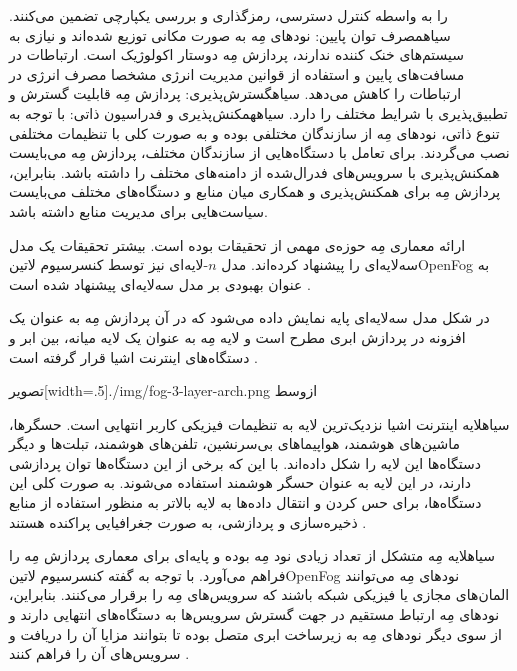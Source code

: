 را به واسطه کنترل دسترسی، رمزگذاری و بررسی یکپارچی تضمین می‌کنند.
 ‌سیاه{مصرف توان پایین}: نودهای مِه به صورت مکانی توزیع شده‌اند و نیازی به سیستم‌های خنک کننده ندارند، پردازش مِه دوستار اکولوژیک است.
ارتباطات در مسافت‌های پایین و استفاده از قوانین مدیریت انرژی مشخصا مصرف انرژی در ارتباطات را کاهش می‌دهد.
 ‌سیاه{گسترش‌پذیری}: پردازش مِه قابلیت گسترش و تطبیق‌پذیری با شرایط مختلف را دارد.
 ‌سیاه{همکنش‌پذیری و فدراسیون ذاتی}: با توجه به تنوع ذاتی، نودهای مِه از سازندگان مختلفی بوده و به صورت کلی با تنظیمات مختلفی نصب می‌گردند.
برای تعامل با دستگاه‌هایی از سازندگان مختلف، پردازش مِه می‌بایست همکنش‌پذیری با سرویس‌های فدرال‌شده از دامنه‌های مختلف را داشته باشد.
بنابراین، پردازش مِه برای همکنش‌پذیری و همکاری میان منابع و دستگاه‌های مختلف می‌بایست سیاست‌هایی برای مدیریت منابع داشته باشد.


ارائه معماری مِه حوزه‌ی مهمی از تحقیقات بوده است. بیشتر تحقیقات یک مدل سه‌لایه‌ای را پیشنهاد کرده‌اند.
مدل $n$-لایه‌ای نیز توسط کنسرسیوم ‌لاتین{OpenFog} به عنوان بهبودی بر مدل سه‌لایه‌ای پیشنهاد شده است
.

در شکل  مدل سه‌لایه‌ای پایه نمایش داده می‌شود که در آن پردازش مِه به عنوان
یک افزونه در پردازش ابری مطرح است و لایه مِه به عنوان یک لایه میانه، بین ابر و دستگاه‌های اینترنت اشیا قرار گرفته است
.

‌تصویر[width=.5\textwidth]{./img/fog-3-layer-arch.png}
‌ازوسط

‌سیاه{لایه اینترنت اشیا} نزدیک‌ترین لایه به تنظیمات فیزیکی کاربر انتهایی است. حسگرها، ماشین‌های هوشمند، هواپیماهای بی‌سرنشین،
تلفن‌های هوشمند، تبلت‌ها و دیگر دستگاه‌ها این لایه را شکل داده‌اند. با این که برخی از این دستگاه‌ها توان پردازشی دارند، در این لایه
به عنوان حسگر هوشمند استفاده می‌شوند. به صورت کلی این دستگاه‌ها، برای حس کردن و انتقال داده‌ها
به لایه بالاتر به منظور استفاده از منابع ذخیره‌سازی و پردازشی، به صورت جغرافیایی پراکنده هستند
.

‌سیاه{لایه مِه} متشکل از تعداد زیادی نود مِه بوده و پایه‌ای برای معماری پردازش مِه را فراهم می‌آورد.
با توجه به گفته کنسرسیوم ‌لاتین{OpenFog} نودهای مِه می‌توانند المان‌های مجازی یا فیزیکی شبکه باشند که سرویس‌های مِه را برقرار می‌کنند.
بنابراین، نودهای مِه ارتباط مستقیم در جهت گسترش سرویس‌ها به دستگاه‌های انتهایی دارند و از سوی دیگر نودهای مِه به زیرساخت ابری متصل بوده تا بتوانند
مزایا آن را دریافت و سرویس‌های آن را فراهم کنند
.

